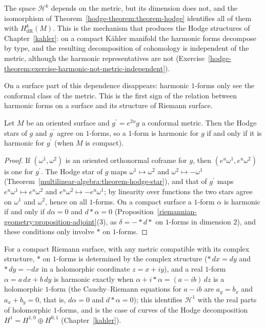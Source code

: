 \begin{remark}\label{hodge-theorem:remark-dependence-on-metric}
The space $\mathcal{H}^k$ depends on the metric, but its dimension does not, and the isomorphism of Theorem~\ref{hodge-theorem:theorem-hodge} identifies all of them with $H^k_{\mathrm{dR}}(M)$. This is the
mechanism that produces the Hodge structures of Chapter~\ref{kahler}: on a compact K\"ahler manifold the harmonic forms decompose by type, and the resulting decomposition of cohomology is
independent of the metric, although the harmonic representatives are not (Exercise~\ref{hodge-theorem:exercise-harmonic-not-metric-independent}).
\end{remark}

On a surface part of this dependence disappears: harmonic $1$-forms only see the conformal class of the metric. This is the first sign of the relation between harmonic forms on a surface and its
structure of Riemann surface.

\begin{proposition}\label{hodge-theorem:proposition-conformal-invariance}
Let $M$ be an oriented surface and $g^{\prime} = e^{2u}g$ a conformal metric. Then the Hodge stars of $g$ and $g^{\prime}$ agree on $1$-forms, so a $1$-form is harmonic for $g$ if and only if it is harmonic
for $g^{\prime}$ (when $M$ is compact).
\end{proposition}

\begin{proof}
If $(\omega^1, \omega^2)$ is an oriented orthonormal coframe for $g$, then $(e^u\omega^1, e^u\omega^2)$ is one for $g^{\prime}$. The Hodge star of $g$ maps $\omega^1 \mapsto \omega^2$ and $\omega^2 \mapsto -\omega^1$
(Theorem~\ref{multilinear-algebra:theorem-hodge-star}), and that of $g^{\prime}$ maps $e^u\omega^1 \mapsto e^u\omega^2$ and $e^u\omega^2 \mapsto -e^u\omega^1$; by linearity over functions the two stars agree on
$\omega^1$ and $\omega^2$, hence on all $1$-forms. On a compact surface a $1$-form $\alpha$ is harmonic if and only if $d\alpha = 0$ and $d{*}\alpha = 0$
(Proposition~\ref{riemannian-geometry:proposition-adjoint}(3), as $\delta = -{*}d{*}$ on $1$-forms in dimension $2$), and these conditions only involve $*$ on $1$-forms.
\end{proof}

For a compact Riemann surface, with any metric compatible with its complex structure, $*$ on $1$-forms is determined by the complex structure ($*\,dx = dy$ and $*\,dy = -dx$ in a holomorphic coordinate
$z = x + iy$), and a real $1$-form $\alpha = a\,dx + b\,dy$ is harmonic exactly when $\alpha + i{*}\alpha = (a - ib)\,dz$ is a holomorphic $1$-form (the Cauchy--Riemann equations for $a - ib$ are
$a_y = b_x$ and $a_x + b_y = 0$, that is, $d\alpha = 0$ and $d{*}\alpha = 0$); this identifies $\mathcal{H}^1$ with the real parts of holomorphic $1$-forms, and is the
case of curves of the Hodge decomposition $H^1 = H^{1,0} \oplus H^{0,1}$ (Chapter~\ref{kahler}).

